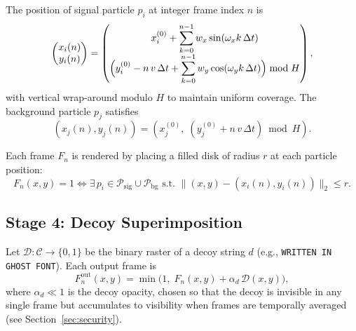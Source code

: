\documentclass[12pt,a4paper]{article}
\begin{document}
The position of signal particle $p_i$ at integer frame index $n$ is
\begin{equation}
  \begin{pmatrix} x_i(n) \\ y_i(n) \end{pmatrix}
  =
  \begin{pmatrix}
    x_i^{(0)} + \displaystyle\sum_{k=0}^{n-1} w_x \sin(\omega_x k\,\Delta t) \\[6pt]
    \Bigl(y_i^{(0)} - n\,v\,\Delta t
          + \displaystyle\sum_{k=0}^{n-1} w_y \cos(\omega_y k\,\Delta t)\Bigr)
    \bmod H
  \end{pmatrix},
\end{equation}
with vertical wrap-around modulo $H$ to maintain uniform coverage.
The background particle $p_j$ satisfies
\begin{equation}
  (x_j(n), y_j(n)) = (x_j^{(0)},\; (y_j^{(0)} + n\,v\,\Delta t) \bmod H).
\end{equation}

Each frame $F_n$ is rendered by placing a filled disk of radius $r$ at each
particle position:
\begin{equation}
  F_n(x, y) = 1 \iff
  \exists\, p_i \in \mathcal{P}_{\mathrm{sig}} \cup \mathcal{P}_{\mathrm{bg}}
  \text{ s.t. }
  \bigl\|(x, y) - (x_i(n), y_i(n))\bigr\|_2 \leq r.
\end{equation}

\subsection{Stage 4: Decoy Superimposition}

Let $\mathcal{D} : \mathcal{C} \to \{0,1\}$ be the binary raster of a decoy
string $d$ (e.g., \texttt{WRITTEN IN GHOST FONT}).  Each output frame is
\begin{equation}
  F_n^{\mathrm{out}}(x, y)
  = \min\!\bigl(1,\; F_n(x, y) + \alpha_d\,\mathcal{D}(x, y)\bigr),
\end{equation}
where $\alpha_d \ll 1$ is the decoy opacity, chosen so that the decoy is
invisible in any single frame but accumulates to visibility when frames are
temporally averaged (see Section~\ref{sec:security}).
\end{document}
